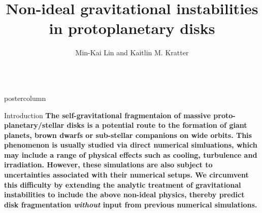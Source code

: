 \documentclass[final,hyperref={pdfpagelabels=false}]{beamer}
\title{{\huge Non-ideal gravitational instabilities in protoplanetary disks}}
\author{Min-Kai Lin and Kaitlin M. Kratter}
\institute[UA]{minkailin@email.arizona.edu, kkratter@email.arizona.edu}
\newlength{\columnheight}
\begin{document}
\captionsetup[subfigure]{labelformat=empty}

\begin{frame}
  \begin{columns}
    \begin{column}{.49\textwidth}
      \begin{beamercolorbox}[center,wd=\textwidth]{postercolumn}
        \begin{minipage}[T]{.95\textwidth}  %
          \parbox[t][\columnheight]{\textwidth}{ %
            \begin{block}{{\Large Introduction}}
              \justifying
              {\large              
                {\bf
                  The self-gravitational fragmentaion of massive
                  proto-planetary/stellar disks is a potential
                  route to the formation of giant planets, brown
                  dwarfs or sub-stellar companions on wide
                  orbits. This phenomenon is usually studied via
                  direct numerical simluations, which may include a
                  range of physical 
                  effects such as cooling, turbulence and 
                  irradiation. However, these simulations are also
                  subject to uncertainties associated with their 
                  numerical setups. We circumvent this difficulty by
                  extending the   
                  analytic treatment of gravitational instabilities 
                  to include the above non-ideal physics, thereby 
                  predict disk fragmentation \emph{without}
                  input from previous numerical simulations. 
                }
              }
            \end{block}
            
}
\end{minipage}
\end{beamercolorbox}
\end{column}
\end{columns}
\end{frame}
\end{document}
